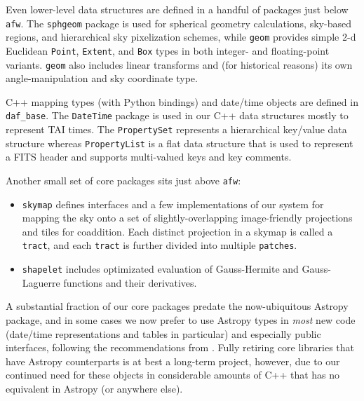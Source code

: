 Even lower-level data structures are defined in a handful of packages just below \texttt{afw}.
The \texttt{sphgeom} package is used for spherical geometry calculations, sky-based regions, and hierarchical sky pixelization schemes, while \texttt{geom} provides simple 2-d Euclidean \texttt{Point}, \texttt{Extent}, and \texttt{Box} types in both integer- and floating-point variants.
\texttt{geom} also includes linear transforms and (for historical reasons) its own angle-manipulation and sky coordinate type.

C++ mapping types (with Python bindings) and date/time objects are defined in \texttt{daf\_base}.
The \texttt{DateTime} package is used in our C++ data structures mostly to represent TAI times.
The \texttt{PropertySet} represents a hierarchical key/value data structure whereas \texttt{PropertyList} is a flat data structure that is used to represent a FITS header and supports multi-valued keys and key comments.

Another small set of core packages sits just above \texttt{afw}:
\begin{itemize}
\item \texttt{skymap} defines interfaces and a few implementations of our system for mapping the sky onto a set of slightly-overlapping image-friendly projections and tiles for coaddition.
    Each distinct projection in a skymap is called a \texttt{tract}, and each \texttt{tract} is further divided into multiple \texttt{patches}.
\item \texttt{shapelet} includes optimizated evaluation of Gauss-Hermite and Gauss-Laguerre functions and their derivatives.
\end{itemize}

A substantial fraction of our core packages predate the now-ubiquitous Astropy package, and in some cases we now prefer to use Astropy types in \emph{most} new code (date/time representations and tables in particular) and especially public interfaces, following the recommendations from \citet{2016SPIE.9913E..0GJ}.
Fully retiring core libraries that have Astropy counterparts is at best a long-term project, however, due to our continued need for these objects in considerable amounts of C++ that has no equivalent in Astropy (or anywhere else).
